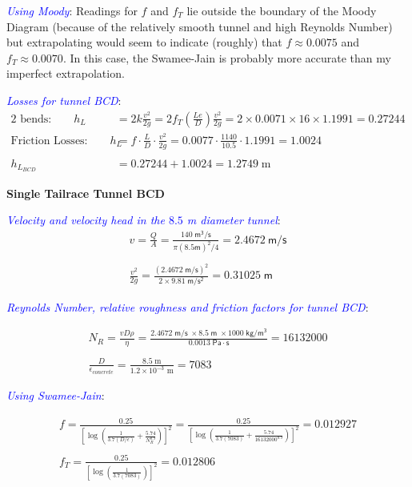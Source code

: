 \documentclass[10pt]{amsart}
\begin{document}
\textcolor{blue}{\em Using Moody}:
Readings for $f$ and $f_T$ lie outside the boundary of the Moody Diagram (because of the relatively smooth tunnel and
high Reynolds Number) but extrapolating would seem to indicate (roughly) that $f\approx 0.0075$ and $f_T\approx
0.0070$. In this case, the Swamee-Jain is probably more accurate than my imperfect extrapolation.

\textcolor{blue}{\em Losses for tunnel BCD}:
\begin{align*}
	\text{2 bends:}\qquad h_{L}         & = 2k\frac{v^2}{2g} =
	2f_T\left(\frac{Le}{D}\right)\frac{v^2}{2g}=2\times 0.0071\times 16\times 1.1991 = 0.27244\\
	\text{Friction Losses:}\qquad h_{L} & = f\cdot\frac{L}{D} \cdot\frac{v^2}{2g} =
	0.0077\cdot\frac{1140}{10.5}\cdot1.1991 = 1.0024\\\\
	h_{L_{BCD}}                         & = 0.27244+1.0024 = 1.2749\;\text{m}
\end{align*}

\textbf{Single Tailrace Tunnel BCD}

\textcolor{blue}{\em Velocity and velocity head in the $8.5$ m diameter tunnel}:\\

\begin{gather*}
	v = \frac{Q}{A} = \frac{140\mathsf{\;m^3/s}}{\pi(8.5\mathsf{ m})^2/4}=2.4672\mathsf{\ m/s}
	\\\\
	\frac{v^2}{2g} = \frac{(2.4672\mathsf{\;m/s})^2}{2\times9.81\mathsf{\;m/s^2}} = 0.31025\mathsf{\; m}
\end{gather*}

\textcolor{blue}{\em Reynolds Number, relative roughness and friction factors for tunnel BCD}:

\begin{gather*}
	N_R = \frac{vD\rho}{\eta} =
	\frac{2.4672\mathsf{\;m/s\;}\times8.5\mathsf{\;m\;}\times1000\mathsf{\;kg/m^3}}{0.0013\;\mathsf{Pa\cdot s}} =
	16132000
	\\\\
	\frac{D}{\epsilon_{concrete}} = \frac{8.5\;\text{m}}{1.2\times10^{-3}\text{ m}} = 7083
\end{gather*}

\textcolor{blue}{\em Using Swamee-Jain}:

\begin{gather*}
	f = \frac{0.25}{\left[\log\left(\frac{1}{3.7(D/\epsilon)}+\frac{5.74}{N_R^{0.9}}\right)\right]^2} =
	\frac{0.25}{\left[\log\left(\frac{1}{3.7(7083)}+\frac{5.74}{16132000^{0.9}}\right)\right]^2}=0.012927
	\\\\
	f_T = \frac{0.25}{\left[\log\left(\frac{1}{3.7(7083)}\right)\right]^2} = 0.012806
\end{gather*}
\end{document}
